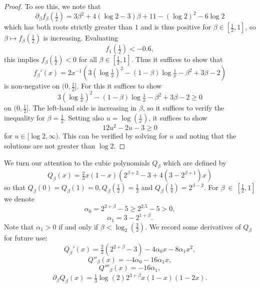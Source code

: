 \documentclass[12pt]{amsart}
\theoremstyle{plain}
\theoremstyle{definition}
\theoremstyle{remark}
\numberwithin{equation}{section}
\begin{document}
\begin{proof}
To see this, we note that 
\[\partial_\beta f_\beta(\tfrac{1}{2}) = 3 \beta^2+4  (\log 2 -3)\beta +11-(\log 2)^2-6 \log 2 \]
which has both roots strictly greater than $1$ and is thus positive for $\beta\in [\tfrac{1}{2},1]$, so $\beta\mapsto f_\beta(\frac12)$ is increasing.  
Evaluating
\begin{equation*}
    f_{1} (\tfrac12) <-0.6,  
\end{equation*}
this implies $f_\beta(\tfrac{1}{2})<0$ for all $\beta\in [\tfrac{1}{2},1]$.
Thus it suffices to show that 
\[f_\beta'(x)=2x^{-1} \left(3 (\log \tfrac{1}{x})^2 -(1-\beta) \log \tfrac{1}{x}  -\beta ^2+3 \beta -2 \right)\]
is non-negative on $(0,\tfrac{1}{2}]$. For this it suffices to show 
\[3 (\log \tfrac{1}{x})^2  -(1-\beta) \log \tfrac{1}{x} - \beta ^2+3 \beta -2\geq 0\]
 on $(0,\tfrac{1}{2}]$.
 The left-hand side is increasing in $\beta$, so it suffices to verify the inequality for $\beta=\tfrac{1}{2}$. Setting also $u=\log(\tfrac{1}{x})$, it   suffices to show
\[12 u^2  -2 u - 3\geq 0 \]
for $u\in [\log2,\infty)$. This can be verified  by solving for $u$ and noting that the solutions are not greater than $\log 2$. 
\end{proof}

We turn our attention to the cubic polynomials $Q_\beta$ which are defined by
\[ Q_\beta(x) = \tfrac23 x (1-x)(2^{\beta+2}-3+4(3-2^{\beta+1})  x) \]
so that $Q_\beta(0)=Q_\beta(1)=0, Q_\beta(\frac12)=\frac12$ and $Q_\beta(\frac14)=2^{\beta-2}$.
For $\beta~\in~[\tfrac{1}{2},1]$ we denote
\begin{equation}\label{eqn:alpha01def}
\alpha_0 = 2^{2 + \beta} - 5 \ge 2^{2.5}-5>0,
\end{equation}
\[ \alpha_1 = 3-2^{1 + \beta}.  \]  
Note that $\alpha_1>0$ if and only if $\beta<\log_2(\frac32)$. 
We record some derivatives of $Q_\beta$ for future use:
\begin{equation}\label{eqn:DQ}
Q_\beta'(x) =\tfrac{2}{3}(2^{2+\beta}-3) - 4\alpha_0x-8\alpha_1 x^2,
\end{equation}
\begin{equation}\label{eqn:DDQ}
Q''_\beta(x)= -4\alpha_0 - 16\alpha_1 x,
\end{equation}
\begin{equation}\label{eqn:DDDQ}
Q'''_\beta(x)=-16\alpha_1,
\end{equation}
\begin{equation}\label{eqn:Qbetaderiv}
\partial_\beta Q_\beta(x) = \tfrac13 \log(2) 2^{3 + \beta} x (1 - x)  (1 - 2 x).
\end{equation}
\end{document}
